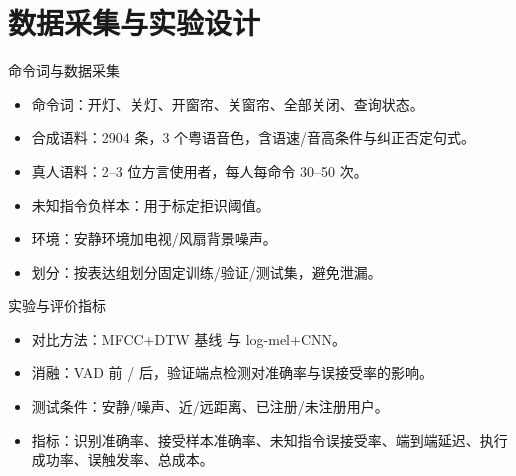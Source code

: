\documentclass[10pt]{beamer}
\begin{document}
\section{数据采集与实验设计}
\begin{frame}{命令词与数据采集}
    \begin{itemize}
        \item 命令词：开灯、关灯、开窗帘、关窗帘、全部关闭、查询状态。
        \item 合成语料：2904 条，3 个粤语音色，含语速/音高条件与纠正否定句式。
        \item 真人语料：2--3 位方言使用者，每人每命令 30--50 次。
        \item 未知指令负样本：用于标定拒识阈值。
        \item 环境：安静环境加电视/风扇背景噪声。
        \item 划分：按表达组划分固定训练/验证/测试集，避免泄漏。
    \end{itemize}
\end{frame}
\begin{frame}{实验与评价指标}
    \begin{itemize}
        \item 对比方法：MFCC+DTW 基线 与 log-mel+CNN。
        \item 消融：VAD 前 / 后，验证端点检测对准确率与误接受率的影响。
        \item 测试条件：安静/噪声、近/远距离、已注册/未注册用户。
        \item 指标：识别准确率、接受样本准确率、未知指令误接受率、端到端延迟、执行成功率、误触发率、总成本。
    \end{itemize}
\end{frame}
\end{document}
